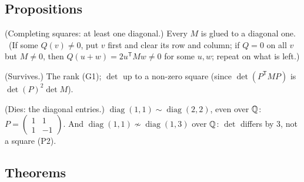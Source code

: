\subsection*{Propositions}

\begin{lines}
\item[\lab{P1}] (Completing squares: at least one diagonal.) Every $M$ is glued to a diagonal one. \ (If some $Q(v) \ne 0$, put $v$ first and clear its row and column; if $Q = 0$ on all $v$ but $M \ne 0$, then $Q(u + w) = 2u^{\mathsf T}Mw \ne 0$ for some $u, w$; repeat on what is left.)
\item[\lab{P2}] (Survives.) The rank (G1); $\det$ up to a non-zero square (since $\det(P^{\mathsf T}MP)$ is $\det(P)^2 \det M$).
\item[\lab{P3}] (Dies: the diagonal entries.) $\operatorname{diag}(1, 1) \sim \operatorname{diag}(2, 2)$, even over $\mathbb{Q}$: $P = \begin{pmatrix} 1 & 1 \\ 1 & -1 \end{pmatrix}$. And $\operatorname{diag}(1, 1) \not\sim \operatorname{diag}(1, 3)$ over $\mathbb{Q}$: $\det$ differs by $3$, not a square (P2).
\end{lines}

\subsection*{Theorems}

